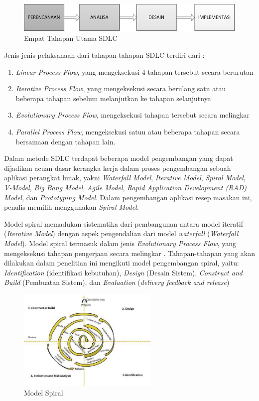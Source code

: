	\begin{figure}[H]
		\centering
		\includegraphics[width=1\textwidth]{gambar/sdlc_overview}
		\caption{Empat Tahapan Utama SDLC}
		\label{sdlc_overview}
	\end{figure}
		
	Jenis-jenis pelaksanaan dari tahapan-tahapan SDLC terdiri dari \cite{pressman}:
	\begin{enumerate}
		\item \emph{Linear Process Flow}, yang mengeksekusi 4 tahapan tersebut secara berurutan
		\item \emph{Iterative Process Flow}, yang mengeksekusi secara berulang satu atau beberapa tahapan sebelum melanjutkan ke tahapan selanjutnya
		\item \emph{Evolutionary Process Flow}, mengeksekusi tahapan tersebut secara melingkar
		\item \emph{Parallel Process Flow}, mengeksekusi satuu atau beberapa tahapan secara bersamaan dengan tahapan lain. 
	\end{enumerate}

	Dalam metode SDLC terdapat beberapa model pengembangan yang dapat dijadikan acuan dasar kerangka kerja dalam proses pengembangan sebuah aplikasi perangkat lunak, yakni \emph{Waterfall Model}, \emph{Iterative Model}, \emph{Spiral Model}, \emph{V-Model}, \emph{Big Bang Model}, \emph{Agile Model}, \emph{Rapid Application Development (RAD) Model}, dan \emph{Prototyping Model}. Dalam pengembangan aplikasi resep masakan ini, penulis memilih menggunakan \emph{Spiral Model}.
	
	Model spiral memadukan sistematika dari pembangunan antara model iteratif (\emph{Iterative Model}) dengan aspek pengendalian dari model \emph{waterfall} (\emph{Waterfall Model}). Model spiral termasuk dalam jenis \emph{Evolutionary Process Flow}, yang mengeksekusi tahapan pengerjaan secara melingkar \cite{tutorialspoint}. Tahapan-tahapan yang akan dilakukan dalam penelitian ini mengikuti model pengembangan spiral, yaitu: \emph{Identification} (identifikasi kebutuhan), \emph{Design} (Desain Sistem), \emph{Construct and Build} (Pembuatan Sistem), dan \emph{Evaluation} (\emph{delivery feedback and release})
    \begin{figure}[H]
		\centering
		\includegraphics[width=0.6\textwidth]{gambar/sdlc_spiral_model}
		\caption{Model Spiral}
		\label{sdlc_spiral_model}
	\end{figure}

